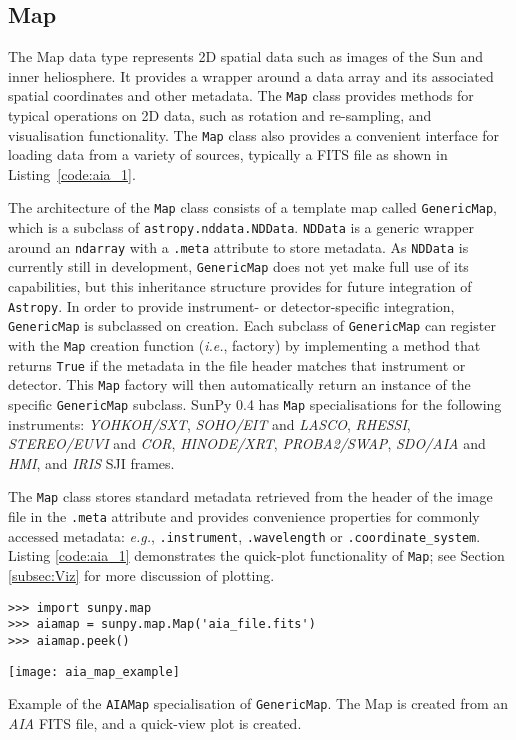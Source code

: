 \subsection{Map}
The Map data type represents 2D spatial data such as images of the Sun and 
inner heliosphere. It provides a wrapper around a data array and its associated
spatial coordinates and other metadata. The \texttt{Map} class provides 
methods for typical operations on 2D data, 
such as rotation and re-sampling, and visualisation functionality.
The \texttt{Map} class
also provides a convenient interface for loading data from a variety of sources, typically
a FITS file as shown in Listing~\ref{code:aia_1}.

The architecture of the \texttt{Map} class consists of a template map called
\texttt{GenericMap}, which is a subclass of \texttt{astropy.nddata.NDData}. \texttt{NDData} is a 
generic wrapper around an \texttt{ndarray} with a \texttt{.meta} attribute to store metadata.
As \texttt{NDData} is currently still in development, \texttt{GenericMap} does not yet make full
use of its capabilities, but this inheritance structure provides 
for future integration of \texttt{Astropy}. In order to provide instrument- or
detector-specific integration, \texttt{GenericMap} is subclassed on creation. 
Each subclass of \texttt{GenericMap} can register with the \texttt{Map} creation function (\textit{i.e.}, factory)
by implementing a method that returns \texttt{True} if the metadata
in the file header matches
that instrument or detector.  This \texttt{Map} factory 
will then automatically return an instance of the specific \texttt{GenericMap} 
subclass. SunPy 0.4 has \texttt{Map} specialisations for the 
following instruments: 
\textit{YOHKOH/SXT}, \textit{SOHO/EIT} and \textit{LASCO}, \textit{RHESSI}, 
\textit{STEREO/EUVI} and \textit{COR}, \textit{HINODE/XRT},
\textit{PROBA2/SWAP}, \textit{SDO/AIA} and \textit{HMI}, 
and \textit{IRIS} SJI frames. 

The \texttt{Map} class stores standard metadata retrieved from the header of 
the image file in the \texttt{.meta} attribute and provides convenience 
properties for commonly accessed metadata: \textit{e.g.}, \texttt{.instrument}, 
\texttt{.wavelength} or \texttt{.coordinate\_system}. 
Listing \ref{code:aia_1} demonstrates the quick-plot functionality of 
\texttt{Map}; see Section \ref{subsec:Viz} for more discussion of plotting.

\begin{listing}[H]
\begin{verbatim}
>>> import sunpy.map
>>> aiamap = sunpy.map.Map('aia_file.fits')
>>> aiamap.peek()
\end{verbatim}
\begin{center}
\texttt{[image: aia\_map\_example]}
\end{center}
\caption{Example of the \texttt{AIAMap} specialisation of 
\texttt{GenericMap}. The Map is created from an \textit{AIA} FITS file,
and a quick-view plot is created.}
\label{code:aia_1}
\end{listing}


